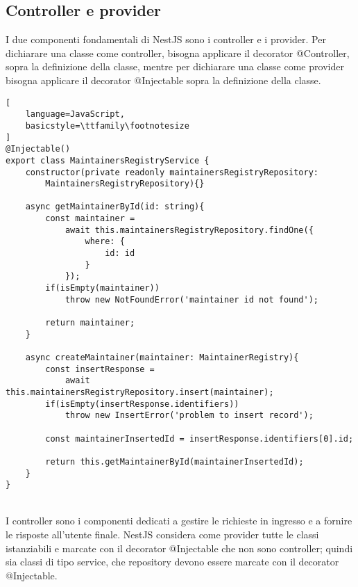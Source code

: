 \subsection{Controller e provider}
I due componenti fondamentali di NestJS sono i controller e i provider. 
Per dichiarare una classe come controller, bisogna applicare il decorator @Controller, sopra la 
definizione della classe, mentre per dichiarare una classe come provider bisogna applicare il decorator
@Injectable sopra la definizione della classe.
\\
\begin{lstlisting}[
    language=JavaScript,
    basicstyle=\ttfamily\footnotesize
]
@Injectable()
export class MaintainersRegistryService {
    constructor(private readonly maintainersRegistryRepository: 
        MaintainersRegistryRepository){}

    async getMaintainerById(id: string){
        const maintainer = 
            await this.maintainersRegistryRepository.findOne({
                where: {
                    id: id
                }
            });
        if(isEmpty(maintainer))
            throw new NotFoundError('maintainer id not found');

        return maintainer;
    }

    async createMaintainer(maintainer: MaintainerRegistry){
        const insertResponse = 
            await this.maintainersRegistryRepository.insert(maintainer);
        if(isEmpty(insertResponse.identifiers))
            throw new InsertError('problem to insert record');

        const maintainerInsertedId = insertResponse.identifiers[0].id;

        return this.getMaintainerById(maintainerInsertedId);
    }
}
\end{lstlisting}
\leavevmode\newline
\\
I controller sono i componenti dedicati a gestire le richieste in ingresso e a fornire le risposte all'utente
finale. NestJS considera come provider tutte le classi istanziabili e marcate con il decorator 
@Injectable che non sono controller; quindi sia classi di tipo service, che repository devono essere marcate
con il decorator @Injectable. 
\\
